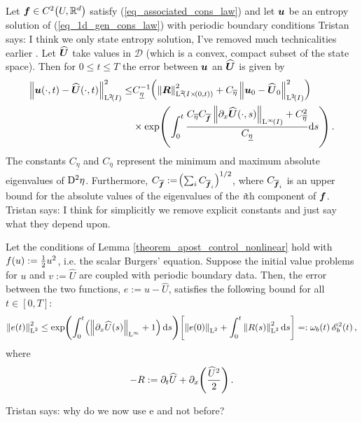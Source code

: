 \documentclass[final]{amsart}
\newcommand{\Coeta}{C_{\overline{\eta}}}
\newcommand{\Cof}{C_{\overline{\vect{f}}}}
\newcommand{\Cofi}{C_{\overline{\vect{f}}_i}}
\newcommand{\Cueta}{C_{\underline{\eta}}}
\newcommand{\recgs}[1]{\widehat{\vec{#1}}}
\renewcommand{\vect}[1]{\geovec{#1}}
\renewcommand{\vec}[1]{\geovec{#1}}
\newcommand{\tristan}[1]{{\color{purple} Tristan says:  #1 }}
\numberwithin{equation}{section}
\begin{document}
\begin{Lem}
  \label{theorem_apost_control_nonlinear}
  Let $\vec{f}\in C^2\qp{U,\mathbb{R}^d}$ satisfy
  (\ref{eq_associated_cons_law}) and let $\vec{u}$ be an entropy
  solution of (\ref{eq_1d_gen_cons_law}) with periodic boundary
  conditions \tristan{I think we only state entropy solution, I've
    removed much technicalities earlier}.  Let $\recgs{U}$ take values
  in $\mathcal{D}$ (which is a convex, compact subset of the state
  space).  Then for $0\leq t\leq T$ the error between $\vec{u}$ an
  $\recgs{U}$ is given by
\begin{equation}\label{eq_bound}
\begin{aligned}
\Norm{\vect{u}\qp{\cdot,t}-\recgs{U}\qp{\cdot,t}}^2_{\leb{2}\qp{I}}\leq&
\Cueta^{-1}\qp{\Norm{\vect{R}}^2_{\leb{2}\qp{I\times\qp{0,t}}}
  +\Coeta\Norm{\vect{u}_0-\recgs{U}_0}^2_{\leb{2}\qp{I}}}\\ &\times\exp\qp{\int_0^t\frac{\Coeta
    \Cof \Norm{\partial_x\recgs{U}\qp{\cdot,s}}_{\leb{\infty}\qp{I}}
    +\Coeta^2}{\Cueta}\mathrm{d}s}.
\end{aligned}
\end{equation}
The constants $\Cueta$ and $\Coeta$ represent the minimum and maximum
absolute eigenvalues of $\mathrm{D}^2 \eta$. Furthermore, $\Cof:=\qp{\sum_i
  \Cofi}^{1/2}$, where $\Cofi$ is an upper bound for the absolute
values of the eigenvalues of the \textit{i}th component of
$\vec{f}$. \tristan{I think for simplicitly we remove explicit
  constants and just say what they depend upon.}
\end{Lem}

\begin{Cor}
  \label{cor_stab_control_burgers}
  Let the conditions of Lemma
  \ref{theorem_apost_control_nonlinear} hold with
  $f\!\left({u}\right):=\frac{1}{2}u^2$, i.e. the scalar Burgers'
  equation. Suppose the initial value problems for $u$ and
  $v:=\widehat{U}$ are coupled with periodic boundary data.
  Then, the error between the two functions, $e:=
  u-\widehat{U}$, satisfies the following bound for all $t\in
  [0,T]$:
  \begin{equation}\label{eq:burgers_bound}
    \Norm{e\qp{t}}^2_{\leb{2}}\leq \exp\qp{\int_0^t\qp{\Norm{\partial_x\widehat{U}\qp{s}}_{\leb{\infty}}+1}\mathrm{d}s}\qb{\Norm{e\qp{0}}_{\leb{2}}+\int_0^t\Norm{R\qp{s}}^2_{\leb{2}}\mathrm{d}s}=: \w_b\qp{t}\cE_b^2\qp{t},
  \end{equation}
  where 
  \begin{equation}
    -R:=\partial_t\widehat{U} +\partial_x\!\left({\frac{\widehat{U}^2}{2}}\right).
  \end{equation}
\end{Cor}
\tristan{why do we now use e and not before?}
\end{document}
